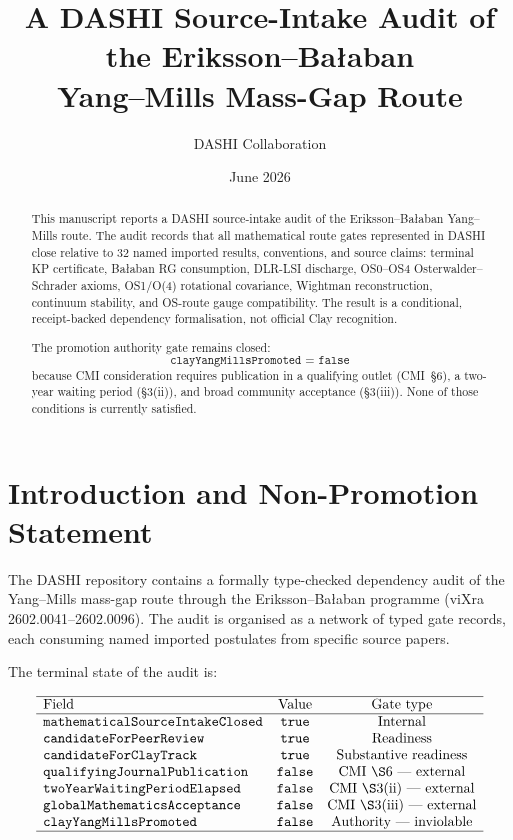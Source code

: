 \documentclass[11pt,a4paper]{article}
\title{A DASHI Source-Intake Audit of the Eriksson--Ba{\l}aban\\[4pt]
       Yang--Mills Mass-Gap Route}
\author{DASHI Collaboration}
\date{June 2026}
\begin{document}
\maketitle

\begin{abstract}
This manuscript reports a DASHI source-intake audit of the Eriksson--Ba{\l}aban
Yang--Mills route.  The audit records that all mathematical route gates
represented in DASHI close relative to 32 named imported results, conventions,
and source claims: terminal KP certificate, Ba{\l}aban RG consumption, DLR-LSI
discharge, OS0--OS4 Osterwalder--Schrader axioms, OS1/O(4) rotational
covariance, Wightman reconstruction, continuum stability, and OS-route gauge
compatibility.  The result is a conditional, receipt-backed dependency
formalisation, not official Clay recognition.

The promotion authority gate remains closed:
\[
\texttt{clayYangMillsPromoted = false}
\]
because CMI consideration requires publication in a qualifying outlet
(CMI~\S6), a two-year waiting period (\S3(ii)), and broad community
acceptance (\S3(iii)).  None of those conditions is currently satisfied.
\end{abstract}

\section{Introduction and Non-Promotion Statement}

The DASHI repository contains a formally type-checked dependency audit of the
Yang--Mills mass-gap route through the Eriksson--Ba{\l}aban programme
(viXra 2602.0041--2602.0096).  The audit is organised as a network of typed
gate records, each consuming named imported postulates from specific source
papers.

The terminal state of the audit is:

\[
\begin{array}{lcc}
\hline
\text{Field} & \text{Value} & \text{Gate type} \\
\hline
\texttt{mathematicalSourceIntakeClosed} & \texttt{true} & \text{Internal} \\
\texttt{candidateForPeerReview} & \texttt{true} & \text{Readiness} \\
\texttt{candidateForClayTrack} & \texttt{true} & \text{Substantive readiness} \\
\texttt{qualifyingJournalPublication} & \texttt{false} & \text{CMI \S6 --- external} \\
\texttt{twoYearWaitingPeriodElapsed} & \texttt{false} & \text{CMI \S3(ii) --- external} \\
\texttt{globalMathematicsAcceptance} & \texttt{false} & \text{CMI \S3(iii) --- external} \\
\texttt{clayYangMillsPromoted} & \texttt{false} & \text{Authority --- inviolable} \\
\hline
\end{array}
\]
\end{document}
